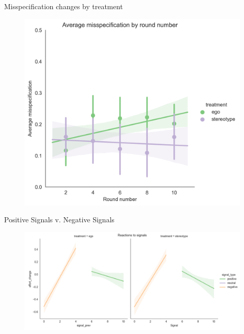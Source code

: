 \documentclass[aspectratio=169]{beamer}
\begin{document}
\begin{frame}{Misspecification changes by treatment}
    \label{misspecificationsrounds}
    \begin{figure}
        \centering
        \includegraphics[scale=.5]{misspecification_round_tratment.png}
    \end{figure}
\end{frame}

\begin{frame}{Positive Signals v. Negative Signals}
    \label{positivevnegative}
    \begin{figure}
        \centering
        \includegraphics[scale=.5]{signalvalue_effort_change.png}
    \end{figure}

\end{frame}
\end{document}
